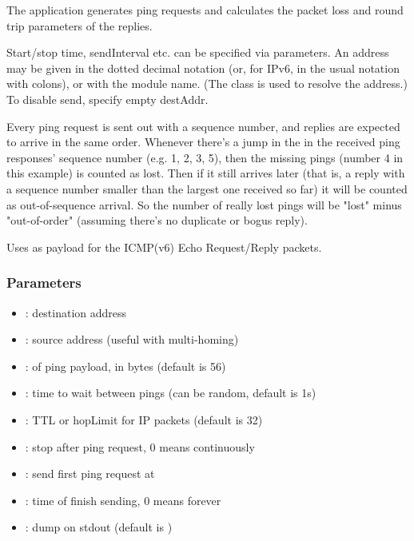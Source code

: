 The  application
generates ping requests and calculates the packet loss and round trip
parameters of the replies.

Start/stop time, sendInterval etc. can be specified via parameters. An address
may be given in the dotted decimal notation (or, for IPv6, in the usual
notation with colons), or with the module name.
(The  class is used to resolve the address.)
To disable send, specify empty destAddr.

Every ping request is sent out with a sequence number, and replies are
expected to arrive in the same order. Whenever there's a jump in the
in the received ping responses' sequence number (e.g. 1, 2, 3, 5), then
the missing pings (number 4 in this example) is counted as lost.
Then if it still arrives later (that is, a reply with a sequence number
smaller than the largest one received so far) it will be counted as
out-of-sequence arrival. So the number of really lost pings will be
"lost" minus "out-of-order" (assuming there's no duplicate or bogus reply).

Uses  as payload for the ICMP(v6) Echo Request/Reply packets.

\subsubsection*{Parameters}

\begin{itemize}
  \item {}: destination address
  \item {}: source address (useful with multi-homing)
  \item {}: of ping payload, in bytes (default is 56)
  \item {}: time to wait between pings (can be random, default is 1s)
  \item {}: TTL or hopLimit for IP packets (default is 32)
  \item {}: stop after  ping request, 0 means continuously
  \item {}: send first ping request at 
  \item {}: time of finish sending, 0 means forever
  \item {}: dump on stdout (default is )
\end{itemize}

